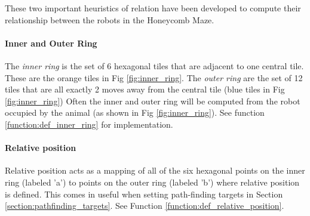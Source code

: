 These two important heuristics of relation have been developed to compute their relationship between the robots in the Honeycomb Maze.

\paragraph{Inner and Outer Ring}

The \textit{inner ring} is the set of 6 hexagonal tiles that are adjacent to one central tile. These are the orange tiles in Fig \ref{fig:inner_ring}.
The \textit{outer ring} are the set of 12 tiles that are all exactly 2 moves away from the central tile (blue tiles in Fig \ref{fig:inner_ring})
Often the inner and outer ring will be computed from the robot occupied by the animal (as shown in Fig \ref{fig:inner_ring}). See function \ref{function:def_inner_ring} for implementation.

\paragraph{Relative position}

Relative position acts as a mapping of all of the six hexagonal points on the inner ring (labeled 'a') to points on the outer ring (labeled 'b') where relative position is defined. This comes in useful when setting path-finding targets in  Section \ref{section:pathfinding_targets}.
See Function \ref{function:def_relative_position}.


